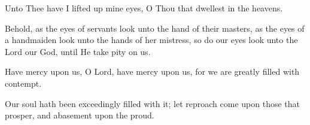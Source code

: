 Unto Thee have I lifted up mine eyes, O Thou that dwellest in the heavens.

Behold, as the eyes of servants look unto the hand of their masters, as the eyes of a handmaiden look unto the hands of her mistress, so do our eyes look unto the Lord our God, until He take pity on us.

Have mercy upon us, O Lord, have mercy upon us, for we are greatly filled with contempt.

Our soul hath been exceedingly filled with it; let reproach come upon those that prosper, and abasement upon the proud.
